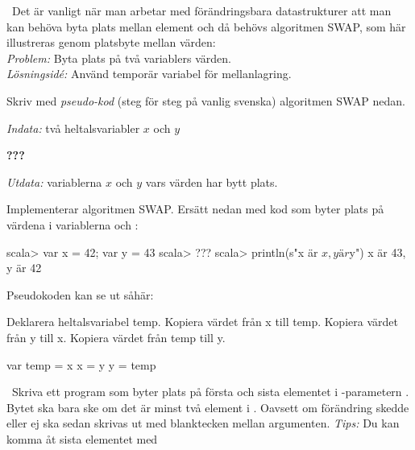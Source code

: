 
\QUESTBEGIN

\Task  \what~Det är vanligt när man arbetar med förändringsbara datastrukturer att man kan behöva byta plats mellan element och då behövs algoritmen SWAP, som här illustreras genom platsbyte mellan värden:
\\ \emph{Problem:} Byta plats på två variablers värden. \\\emph{Lösningsidé:} Använd temporär variabel för mellanlagring.

\Subtask Skriv med \emph{pseudo-kod} (steg för steg på vanlig svenska) algoritmen SWAP nedan.

\emph{Indata:} två heltalsvariabler $x$ och $y$

\textbf{???}

\emph{Utdata:} variablerna $x$ och $y$ vars värden har bytt plats.

\Subtask Implementerar algoritmen SWAP. Ersätt  nedan med kod som byter plats på värdena i variablerna  och :

\begin{REPL}
scala> var x = 42; var y = 43
scala> ???
scala> println(s"x är $x, y är $y") 
x är 43, y är 42
\end{REPL}

\SOLUTION

\TaskSolved \what

\SubtaskSolved  Pseudokoden kan se ut såhär:
\begin{Code}
Deklarera heltalsvariabel temp.
Kopiera värdet från x till temp.
Kopiera värdet från y till x.
Kopiera värdet från temp till y.
\end{Code}

\SubtaskSolved
\begin{Code}
var temp = x
x = y
y = temp
\end{Code}

\QUESTEND





\QUESTBEGIN

\Task \what~Skriva ett program som byter plats på första och sista elementet i -parametern . Bytet ska bara ske om det är minst två element i . Oavsett om förändring skedde eller ej ska  sedan skrivas ut med blanktecken mellan argumenten.
  \emph{Tips:} Du kan komma åt sista elementet med 


